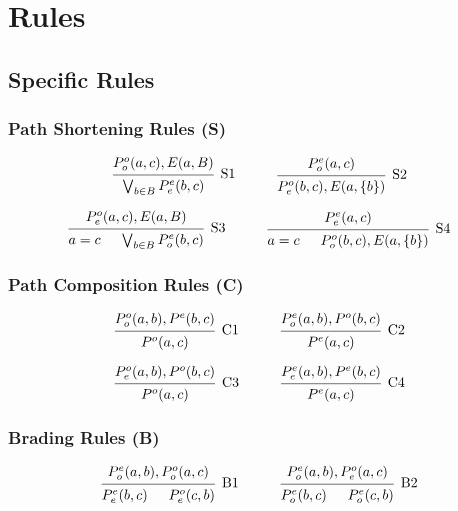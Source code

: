\clearpage
\section{Rules}
\label{sec:Rules}
\subsection{Specific Rules}
\label{sub:Specific Rules}
\subsubsection{Path Shortening Rules (S)}
\label{subs:Path Shortening Rule}
\[
\begin{prooftree}
  \Hypo{P^o_o(a,c),E(a,B)}
  \Infer1[S1]{ \bigvee_{b \in B}P^e_e(b,c)}
\end{prooftree}
\quad \quad \quad
\begin{prooftree}
  \Hypo{P^e_o(a,c)}
  \Infer1[S2]{ P^o_e(b,c),E(a,\{b\})}
\end{prooftree}
\]

\[
\begin{prooftree}[downwards]
  \Hypo{a=c}
  \Hypo{\bigvee_{b \in B}P^e_o(b,c)}
  \Infer2[S3]{P^o_e(a,c),E(a,B)}
\end{prooftree}
\quad \quad \quad
\begin{prooftree}[downwards]
  \Hypo{a=c}
  \Hypo{P^o_o(b,c),E(a,\{b\})}
  \Infer2[S4]{ P^e_e(a,c)}
\end{prooftree}
\]

\subsubsection{Path Composition Rules (C)}
\label{subs:Path Composition Rules (C)}
\[
\begin{prooftree}
  \Hypo{P^o_o(a,b),P^e(b,c)}
  \Infer1[C1]{P^o(a,c)}
\end{prooftree}
\quad \quad \quad
\begin{prooftree}
  \Hypo{P^e_o(a,b),P^o(b,c)}
  \Infer1[C2]{P^e(a,c)}
\end{prooftree}
\]

\[
\begin{prooftree}
  \Hypo{P^o_e(a,b),P^o(b,c)}
  \Infer1[C3]{P^o(a,c)}
\end{prooftree}
\quad \quad \quad
\begin{prooftree}
  \Hypo{P^e_e(a,b),P^e(b,c)}
  \Infer1[C4]{P^e(a,c)}
\end{prooftree}
\]

\subsubsection{Brading Rules (B)}
\label{subs:Brading Rules}
\[
\begin{prooftree}[downwards]
  \Hypo{P^e_e(b,c)}
  \Hypo{P^o_e(c,b)}
  \Infer2[B1]{P^e_o(a,b), P^o_o(a,c)}
\end{prooftree}
\quad \quad \quad
\begin{prooftree}[downwards]
  \Hypo{P^e_o(b,c)}
  \Hypo{P^e_o(c,b)}
  \Infer2[B2]{P^e_o(a,b), P^o_e(a,c)}
\end{prooftree}
\]

